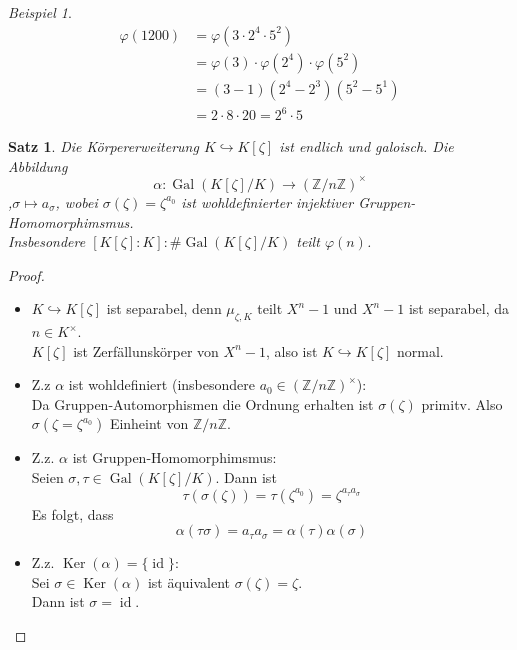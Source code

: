 \documentclass[10pt,a4paper]{article}
\newcommand{\Z}{\ensuremath{\mathbb{Z}}}
\newcommand{\al}{\ensuremath{\alpha}}
\newcommand{\Ker}{\ensuremath{\operatorname{Ker}}}
\newcommand{\id}{\operatorname{id}}
\newcommand{\Gal}{\ensuremath{\operatorname{Gal}}}
\newcounter{thm}[section]
\theoremstyle{definition}
\theoremstyle{plain}
\newtheorem{satz}[thm]{Satz}
\theoremstyle{remark}
\newtheorem*{exm*}{Beispiel}
\begin{document}
\begin{exm*}
	\begin{align*}
	\varphi(1200)&=\varphi(3\cdot2^4\cdot 5^2)\\
	&=\varphi(3)\cdot\varphi(2^4)\cdot\varphi(5^2)\\
	&=(3-1)(2^4-2^3)(5^2-5^1)\\
	&=2\cdot8\cdot 20=2^6\cdot 5
	\end{align*}
\end{exm*}


\begin{satz}\label{1110satz}
	Die Körpererweiterung $K\hookrightarrow K[\zeta]$ ist endlich und galoisch. Die Abbildung
	$$\al:\Gal(K[\zeta]/K)\to(\Z/n\Z)^\times$$,$\sigma\mapsto a_\sigma$, wobei $\sigma(\zeta)=\zeta^{a_0}$ ist wohldefinierter injektiver Gruppen-Homomorphimsmus.\\
	Insbesondere $[K[\zeta]:K]:\#\Gal(K[\zeta]/K)$ teilt $\varphi(n)$.
\end{satz}
\begin{proof}
	\begin{itemize}
		\item $K\hookrightarrow K[\zeta]$ ist separabel, denn $\mu_{\zeta,K}$ teilt $X^n-1$ und $X^n-1$ ist separabel, da $n\in K^\times$.\\
		$K[\zeta]$ ist Zerfällunskörper von $X^n-1$, also ist $K\hookrightarrow K[\zeta]$ normal.
		\item Z.z $\al$ ist wohldefiniert (insbesondere $a_0\in(\Z/n\Z)^\times$):\\
		Da Gruppen-Automorphismen die Ordnung erhalten ist $\sigma(\zeta)$ primitv. Also $\sigma(\zeta=\zeta^{a_0})$ Einheint von $\Z/n\Z$.
		\item Z.z. $\al$ ist Gruppen-Homomorphimsmus:\\
		Seien $\sigma,\tau\in\Gal(K[\zeta]/K)$. Dann ist
		\[\tau(\sigma(\zeta))=\tau(\zeta^{a_0})=\zeta^{a_\tau a_\sigma}\]
		Es folgt, dass
		\[\al(\tau\sigma)=a_\tau a_\sigma=\al(\tau)\al(\sigma)\]
		\item Z.z. $\Ker(\al)=\{\id\}$:\\
		Sei $\sigma\in\Ker(\al)$ ist äquivalent $\sigma(\zeta)=\zeta$.\\
		Dann ist $\sigma=\id$.
	\end{itemize}
\end{proof}
\end{document}
